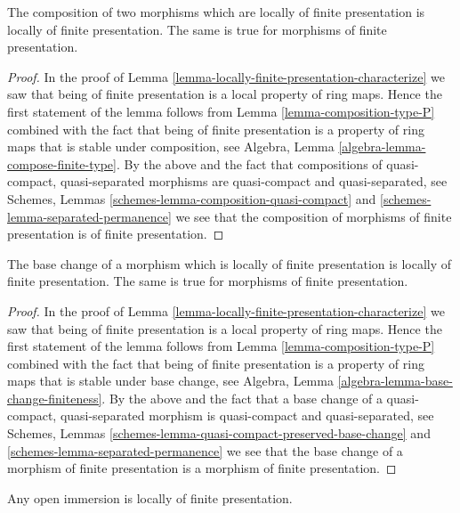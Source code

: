 \begin{lemma}
\label{lemma-composition-finite-presentation}
The composition of two morphisms which are locally of finite presentation is
locally of finite presentation.
The same is true for morphisms of finite presentation.
\end{lemma}

\begin{proof}
In the proof of Lemma \ref{lemma-locally-finite-presentation-characterize}
we saw that being of finite presentation is a local property of ring maps.
Hence the first statement of the lemma follows from
Lemma \ref{lemma-composition-type-P} combined
with the fact that being of finite presentation
is a property of ring maps that is
stable under composition, see
Algebra, Lemma \ref{algebra-lemma-compose-finite-type}.
By the above and the fact that compositions of
quasi-compact, quasi-separated morphisms are
quasi-compact and quasi-separated, see
Schemes, Lemmas \ref{schemes-lemma-composition-quasi-compact}
and \ref{schemes-lemma-separated-permanence}
we see that the composition of morphisms of finite presentation is
of finite presentation.
\end{proof}

\begin{lemma}
\label{lemma-base-change-finite-presentation}
The base change of a morphism which is locally of finite presentation
is locally of finite presentation. The same is true for morphisms of
finite presentation.
\end{lemma}

\begin{proof}
In the proof of Lemma \ref{lemma-locally-finite-presentation-characterize}
we saw that being of finite presentation is a local property of ring maps.
Hence the first statement of the lemma follows from
Lemma \ref{lemma-composition-type-P} combined
with the fact that being of finite presentation
is a property of ring maps that is
stable under base change, see
Algebra, Lemma \ref{algebra-lemma-base-change-finiteness}.
By the above and the fact that a base change of a
quasi-compact, quasi-separated morphism is quasi-compact
and quasi-separated, see
Schemes, Lemmas \ref{schemes-lemma-quasi-compact-preserved-base-change}
and \ref{schemes-lemma-separated-permanence}
we see that the base change of a morphism of finite presentation is
a morphism of finite presentation.
\end{proof}

\begin{lemma}
\label{lemma-open-immersion-locally-finite-presentation}
Any open immersion is locally of finite presentation.
\end{lemma}

